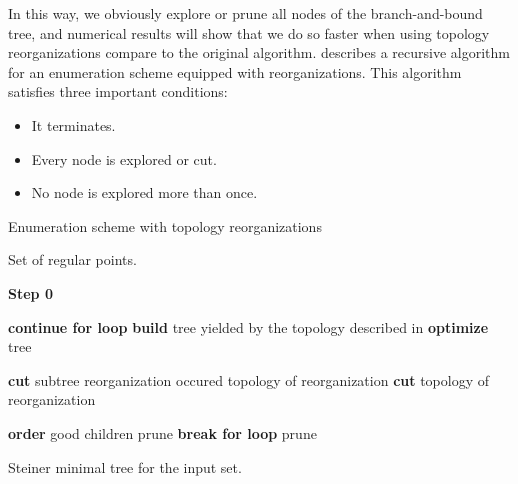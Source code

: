\documentclass{article}
\theoremstyle{plain}
\begin{document}
In this way, we obviously explore or prune all nodes of the \mbox{branch-and-bound} tree, and numerical results will show that we do so faster when using topology reorganizations compare to the original algorithm.
 describes a recursive algorithm for an enumeration scheme equipped with reorganizations. 
This algorithm satisfies three important conditions:
\begin{itemize}
\item It terminates.
\item Every node is explored or cut.
\item No node is explored more than once.
\end{itemize}



\begin{algorithm}
\renewcommand{\algorithmicrequire}{\textbf{Input:}}
\renewcommand{\algorithmicensure}{\textbf{Output:}}

\caption{Enumeration scheme with topology reorganizations}
\label{OES}

\begin{algorithmic}[1]
\Require Set of regular points.
\Statex\hrulefill

\Statex \textbf{Step 0} 
\State {}

\Statex 
{}
	\For {}
		\State 
		\State 
		\If {}
			\State \textbf{continue for loop}
		\EndIf
		\State \textbf{build} tree yielded by the topology described in 
		\State \textbf{optimize} tree \label{lin:ch}
		
		
			\If {}
				\State \textbf{cut}  subtree
				\State 
			\EndIf
		\Else \Comment reorganization occured
			\State 
			\State  topology of reorganization
			\State {}
				\State 
				\If {}
					\State \textbf{cut} 
				\Else
					\State  topology of reorganization
					\State {}
				\EndIf
			\EndIf
		\EndIf
	\EndFor
	
		\State \textbf{order} good children
			\State 
			\If {}
				\State 
				\State {}		
			\Else
				\State prune 
				\State \textbf{break for loop}
			\EndIf
		\EndFor
	\Else
		\State prune 
	\EndIf
\EndProcedure

\hrulefill
\Ensure Steiner minimal tree  for the input set.

\end{algorithmic}

\end{algorithm}
\end{document}

